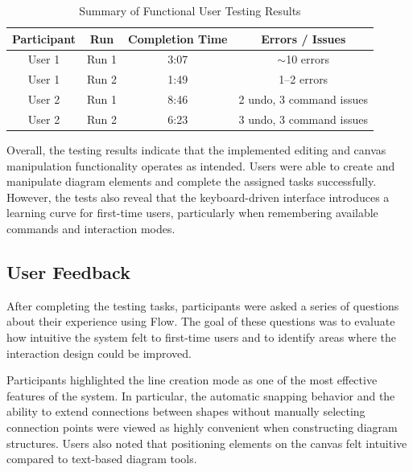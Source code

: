 \documentclass[12pt, titlepage]{article}
\begin{document}
\vspace{1em}

\begin{table}[h]
\centering
\begin{tabular}{c c c c}
\toprule
Participant & Run & Completion Time & Errors / Issues \\
\midrule
User 1 & Run 1 & 3:07 & $\sim$10 errors \\
User 1 & Run 2 & 1:49 & 1--2 errors \\
User 2 & Run 1 & 8:46 & 2 undo, 3 command issues \\
User 2 & Run 2 & 6:23 & 3 undo, 3 command issues \\
\bottomrule
\end{tabular}
\caption{Summary of Functional User Testing Results}
\end{table}


\vspace{1em}

Overall, the testing results indicate that the implemented editing and canvas
manipulation functionality operates as intended. Users were able to create
and manipulate diagram elements and complete the assigned tasks successfully.
However, the tests also reveal that the keyboard-driven interface introduces
a learning curve for first-time users, particularly when remembering
available commands and interaction modes.


\subsection{User Feedback}

After completing the testing tasks, participants were asked a series of
questions about their experience using Flow. The goal of these questions was
to evaluate how intuitive the system felt to first-time users and to identify
areas where the interaction design could be improved.

\vspace{1em}

Participants highlighted the line creation mode as one of the most effective
features of the system. In particular, the automatic snapping behavior and
the ability to extend connections between shapes without manually selecting
connection points were viewed as highly convenient when constructing
diagram structures. Users also noted that positioning elements on the canvas
felt intuitive compared to text-based diagram tools.

\vspace{1em}
\end{document}
